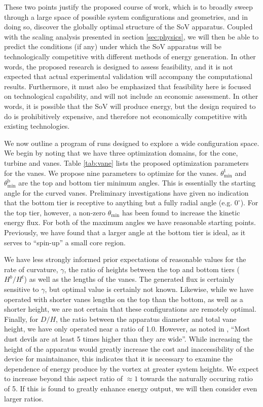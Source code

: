 These two points justify the proposed course of work, which is to
broadly sweep through a large space of possible system configurations
and geometries, and in doing so, discover the globally optimal structure
of the SoV apparatus. Coupled with the scaling analysis presented in
section \ref{sec:physics}, we will then be able to predict the
conditions (if any) under which the SoV apparatus will be
technologically competitive with different methods of energy
generation. In other words, the proposed research is designed to assess
feasibility, and it is not expected that actual experimental validation
will accompany the computational results. Furthermore, it must also be
emphasized that feasibility here is focused on technological capability,
and will not include an economic assessment. In other words, it is
possible that the SoV will produce energy, but the design required to do
is prohibitively expensive, and therefore not economically competitive
with existing technologies. 

%
%
We now outline a program of runs designed to explore a wide
configuration space. We begin by noting that we have three 
optimization domains, for the cone, turbine and vanes. Table
\ref{tab:vane} lists the proposed optimization parameters for the
vanes. We propose nine parameters to optimize for the
vanes. $\theta^{\text{t}}_{\text{min}}$ and
$\theta^{\text{b}}_{\text{min}}$ are the top and bottom tier minimum
angles. This is essentially the starting angle for the curved
vanes. Preliminary investigations have given no indication that the
bottom tier is receptive to anything but a fully radial angle
(e.g. $0^{\circ}$). For the top tier, however, a non-zero
$\theta_{\text{min}}$ has been found to increase the kinetic energy
flux. For both of the maximum angles we have reasonable starting
points. Previously, we have found that a larger angle at the bottom tier
is ideal, as it serves to ``spin-up'' a small core region.

We have less strongly informed prior expectations of reasonable values
for the rate of curvature, $\gamma$, the ratio of heights between the
top and bottom tiers ($H^b/H^t$) as well as the lengths of the
vanes. The generated flux is certainly sensitive to $\gamma$, but
optimal value is certainly not known. Likewise, while we have operated
with shorter vanes lengths on the top than the bottom, as well as a
shorter height, we are not certain that these configurations are
remotely optimal. Finally, for $D/H$, the ratio between the apparatus
diameter and total vane height, we have only operated near a ratio of
1.0. However, as noted in \cite{ROG:ROG1635}, ``Most dust devils are at 
least 5 times higher than they are wide''. While increasing the height
of the apparatus would greatly increase the cost and inaccessibility of
the device for maintainance, this indicates that it is necessary to
examine the dependence of energy produce by the vortex at greater system
heights. We expect to increase beyond this aspect ratio of $\approx 1$
towards the naturally occuring ratio of 5. If this is found to greatly
enhance energy output, we will then consider even larger ratios. 

